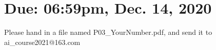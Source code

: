 \documentclass[a4paper, 11pt]{article}
\begin{document}
\section{Due: 06:59pm, Dec. 14, 2020}

 Please hand in a file named \textsf{P03\_YourNumber.pdf}, and send it to \textsf{ai\_course2021@163.com}
\end{document}
